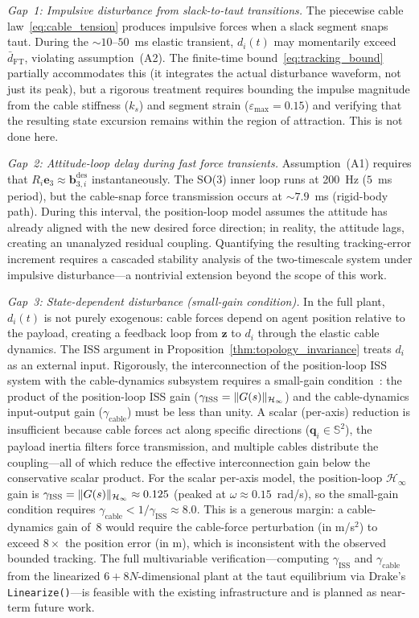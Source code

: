 \emph{Gap~1: Impulsive disturbance from slack-to-taut transitions.}
The piecewise cable law~\eqref{eq:cable_tension} produces impulsive forces when a slack segment snaps taut. During the ${\sim}10$--$50$~ms elastic transient, $d_i(t)$ may momentarily exceed $\bar{d}_{\mathrm{FT}}$, violating assumption~(A2). The finite-time bound~\eqref{eq:tracking_bound} partially accommodates this (it integrates the actual disturbance waveform, not just its peak), but a rigorous treatment requires bounding the impulse magnitude from the cable stiffness ($k_s$) and segment strain ($\varepsilon_{\max} = 0.15$) and verifying that the resulting state excursion remains within the region of attraction. This is not done here.

\emph{Gap~2: Attitude-loop delay during fast force transients.}
Assumption~(A1) requires that $R_i \bm{e}_3 \approx \bm{b}_{3,i}^{\mathrm{des}}$ instantaneously. The SO(3) inner loop runs at 200~Hz ($5$~ms period), but the cable-snap force transmission occurs at ${\sim}7.9$~ms (rigid-body path). During this interval, the position-loop model assumes the attitude has already aligned with the new desired force direction; in reality, the attitude lags, creating an unanalyzed residual coupling. Quantifying the resulting tracking-error increment requires a cascaded stability analysis of the two-timescale system under impulsive disturbance---a nontrivial extension beyond the scope of this work.

\emph{Gap~3: State-dependent disturbance (small-gain condition).}
In the full plant, $d_i(t)$ is not purely exogenous: cable forces depend on agent position relative to the payload, creating a feedback loop from $\bm{z}$ to $d_i$ through the elastic cable dynamics. The ISS argument in Proposition~\ref{thm:topology_invariance} treats $d_i$ as an external input. Rigorously, the interconnection of the position-loop ISS system with the cable-dynamics subsystem requires a small-gain condition~\cite{sontag2008iss}: the product of the position-loop ISS gain ($\gamma_{\mathrm{ISS}} = \lVert G(s) \rVert_{\mathcal{H}_\infty}$) and the cable-dynamics input-output gain ($\gamma_{\mathrm{cable}}$) must be less than unity. A scalar (per-axis) reduction is insufficient because cable forces act along specific directions ($\bm{q}_i \in \mathbb{S}^2$), the payload inertia filters force transmission, and multiple cables distribute the coupling---all of which reduce the effective interconnection gain below the conservative scalar product. For the scalar per-axis model, the position-loop $\mathcal{H}_\infty$ gain is $\gamma_{\mathrm{ISS}} = \lVert G(s) \rVert_{\mathcal{H}_\infty} \approx 0.125$ (peaked at $\omega \approx 0.15$~rad/s), so the small-gain condition requires $\gamma_{\mathrm{cable}} < 1/\gamma_{\mathrm{ISS}} \approx 8.0$. This is a generous margin: a cable-dynamics gain of~$8$ would require the cable-force perturbation (in m/s$^2$) to exceed $8\times$ the position error (in m), which is inconsistent with the observed bounded tracking. The full multivariable verification---computing $\gamma_{\mathrm{ISS}}$ and $\gamma_{\mathrm{cable}}$ from the linearized $6{+}8N$-dimensional plant at the taut equilibrium via Drake's \texttt{Linearize()}---is feasible with the existing infrastructure and is planned as near-term future work.

